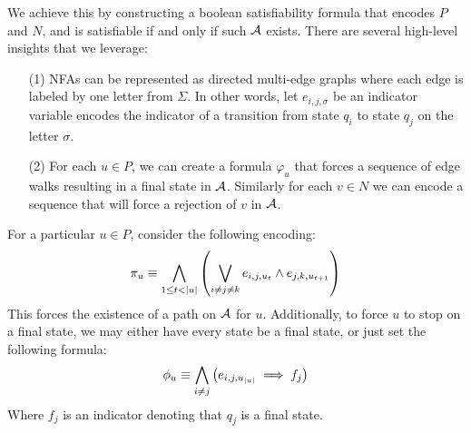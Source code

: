 \documentclass[12pt]{article}
\begin{document}
We achieve this by constructing a boolean satisfiability formula
that encodes \(P\) and \(N\),
and is satisfiable if and only if such \(\mathcal{A}\) exists.
There are several high-level insights that we leverage:
\begin{enumerate}
  \item[(1)]
    NFAs can be represented as directed multi-edge graphs
    where each edge is labeled by one letter from \(\Sigma\).
    In other words, let \(e_{i, j, \sigma}\) be an indicator
    variable encodes the indicator of a transition from state \(q_i\)
    to state \(q_j\) on the letter \(\sigma\).

  \item[(2)]
    For each \(u \in P\),
    we can create a formula \(\varphi_u\) that forces a sequence of edge walks
    resulting in a final state in \(\mathcal{A}\).
    Similarly for each \(v \in N\) we can encode a sequence that will force
    a rejection of \(v\) in \(\mathcal{A}\).

\end{enumerate}

For a particular \(u \in P\), consider the following encoding:
\begin{align*}
  \pi_u \equiv
    \bigwedge_{1 \leq t < \left\lvert u\right\rvert}
      \left(\bigvee_{i \neq j \neq k}
        e_{i, j, u_t} \land e_{j, k, u_{t + 1}}\right)
\end{align*}
This forces the existence of a path on \(\mathcal{A}\) for \(u\).
Additionally, to force \(u\) to stop on a final state,
we may either have every state be a final state, or just set the following
formula:
\begin{align*}
  \phi_u \equiv
    \bigwedge_{i \neq j} \left(e_{i, j, u_{\left\lvert u\right\rvert}} \implies f_j\right)
\end{align*}
Where \(f_j\) is an indicator denoting that \(q_j\) is a final state.
\end{document}
